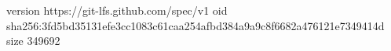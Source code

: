 version https://git-lfs.github.com/spec/v1
oid sha256:3fd5bd35131efe3cc1083c61caa254afbd384a9a9c8f6682a476121e7349414d
size 349692
